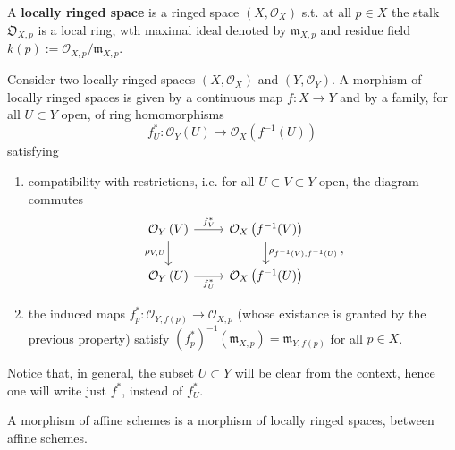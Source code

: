 \begin{defn}
	A \textbf{locally ringed space} is a ringed space $\left( X, \mathcal{O}_{ X } \right)$ s.t.
	at all $p \in X$ the stalk $\mathfrak{O}_{X, p}$ is a local ring,
	wth maximal ideal denoted by $\mathfrak{m}_{X,p}$
	and residue field $k(p) := \mathcal{O}_{X,p}/\mathfrak{m}_{X,p}$.
\end{defn}

\begin{defn}
	Consider two locally ringed spaces $\left( X, \mathcal{O}_{ X } \right)$ and $\left( Y, \mathcal{O}_{ Y } \right)$.
	A morphism of locally ringed spaces is given by 
	a continuous map $f: X \to Y$ and by a family, for all $U \subset Y$ open, of ring homomorphisms
	\begin{equation}
		f^*_U: \mathcal{O}_{Y} \left( U \right) \to \mathcal{O}_{X} \left( f^{-1}(U) \right)
	\end{equation} 
	satisfying
	\begin{enumerate}
		\item compatibility with restrictions, i.e.
			for all $U \subset V \subset Y$ open, the diagram commutes
			\begin{equation}
			\begin{tikzcd}
				\mathcal{O}_{Y} \left( V \right) \arrow[r, "f^*_V", rightarrow] 
				\arrow[d, "\rho_{V,U}"', rightarrow] &
				\mathcal{O}_{X} \left( f^{-1}(V) \right)
				\arrow[d, "\rho_{f^{-1}(V), f^{-1}(U)}", rightarrow] \\
				\mathcal{O}_{Y} \left( U \right) \arrow[r, "f^*_U"', rightarrow] &
				\mathcal{O}_{X} \left( f^{-1}(U) \right)
			\end{tikzcd}
			,\end{equation} 
		\item the induced maps $f^*_p : \mathcal{O}_{Y, f(p)} \to \mathcal{O}_{X,p}$
			(whose existance is granted by the previous property)
			satisfy $\left( f^*_p \right)^{-1}(\mathfrak{m}_{X,p}) = \mathfrak{m}_{Y, f(p)}$
			for all $p \in X$.
	\end{enumerate}
	Notice that, in general, the subset $U \subset Y$ will be clear from the context, hence
	one will write just $f^*$, instead of $f^*_U$.
\end{defn}

\begin{defn}
	A morphism of affine schemes is a morphism of locally
	ringed spaces, between affine schemes.
\end{defn}

